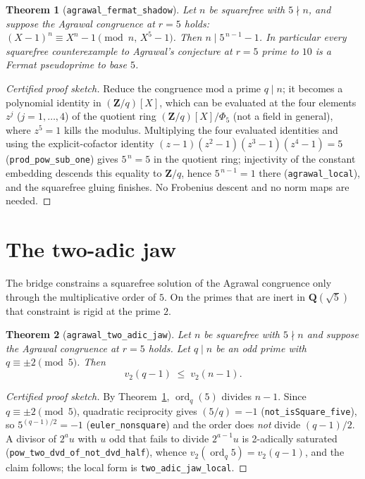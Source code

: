 \documentclass[11pt]{amsart}
\newtheorem{theorem}{Theorem}[section]
\theoremstyle{remark}
\newcommand{\Z}{\mathbf{Z}}
\newcommand{\lean}[1]{\texttt{#1}}
\begin{document}
\begin{theorem}[\lean{agrawal\_fermat\_shadow}]\label{thm:bridge}
Let \(n\) be squarefree with \(5\nmid n\), and suppose the Agrawal
congruence at \(r=5\) holds:
\((X-1)^n\equiv X^n-1\pmod{n,\,X^5-1}\).
Then \(n\mid 5^{\,n-1}-1\). In particular every squarefree
counterexample to Agrawal's conjecture at \(r=5\) prime to \(10\) is
a Fermat pseudoprime to base \(5\).
\end{theorem}

\begin{proof}[Certified proof sketch]
Reduce the congruence mod a prime \(q\mid n\); it becomes a
polynomial identity in \((\Z/q)[X]\), which can be evaluated at the
four elements \(z^j\) (\(j=1,\dots,4\)) of the quotient ring
\((\Z/q)[X]/\Phi_5\) (not a field in general), where \(z^5=1\) kills
the modulus. Multiplying the four evaluated identities and using the
explicit-cofactor identity \((z-1)(z^2-1)(z^3-1)(z^4-1)=5\)
(\lean{prod\_pow\_sub\_one}) gives \(5^{\,n}=5\) in the quotient
ring; injectivity of the constant embedding descends this equality
to \(\Z/q\), hence \(5^{\,n-1}=1\) there (\lean{agrawal\_local}),
and the squarefree gluing finishes. No Frobenius descent and no norm
maps are needed.
\end{proof}

\section{The two-adic jaw}

The bridge constrains a squarefree solution of the Agrawal congruence
only through the multiplicative order of \(5\). On the primes that are
inert in \(\mathbf{Q}(\sqrt5)\) that constraint is rigid at the
prime \(2\).

\begin{theorem}[\lean{agrawal\_two\_adic\_jaw}]\label{thm:jaw}
Let \(n\) be squarefree with \(5\nmid n\) and suppose the Agrawal
congruence at \(r=5\) holds. Let \(q\mid n\) be an odd prime with
\(q\equiv\pm2\pmod5\). Then
\[
v_2(q-1)\;\le\;v_2(n-1).
\]
\end{theorem}

\begin{proof}[Certified proof sketch]
By Theorem~\ref{thm:bridge}, \(\operatorname{ord}_q(5)\) divides
\(n-1\). Since \(q\equiv\pm2\pmod5\), quadratic reciprocity gives
\((5/q)=-1\) (\lean{not\_isSquare\_five}), so \(5^{(q-1)/2}=-1\)
(\lean{euler\_nonsquare}) and the order does \emph{not} divide
\((q-1)/2\). A divisor of \(2^{a}u\) with \(u\) odd that fails to
divide \(2^{a-1}u\) is 2-adically saturated
(\lean{pow\_two\_dvd\_of\_not\_dvd\_half}), whence
\(v_2(\operatorname{ord}_q5)=v_2(q-1)\), and the claim follows; the
local form is \lean{two\_adic\_jaw\_local}.
\end{proof}
\end{document}
